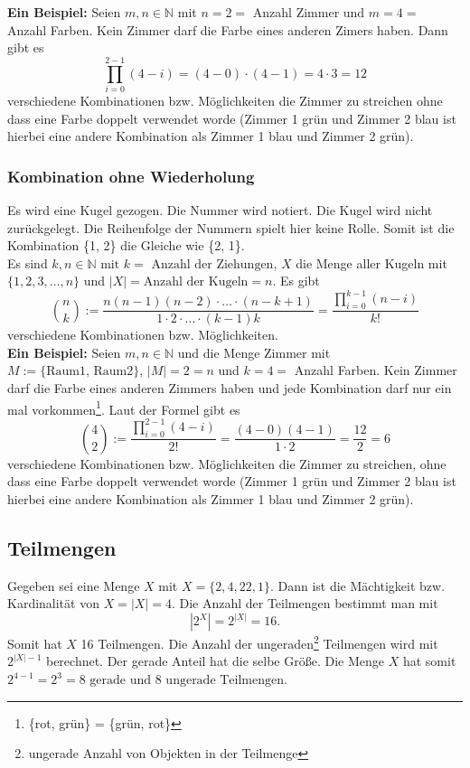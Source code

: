 \documentclass[12pt, twoside]{article}
\newcommand{\N}{\mathbb{N}}
\begin{document}
\textbf{Ein Beispiel:} Seien $m, n \in \N$ mit $n=2=$ Anzahl Zimmer und $m=4=$ Anzahl Farben. Kein Zimmer darf
die Farbe eines anderen Zimers haben. Dann gibt es 
$$
\prod_{i=0}^{2-1}(4-i)=(4-0)\cdot (4-1)=4 \cdot 3 = 12
$$
verschiedene Kombinationen bzw. Möglichkeiten die Zimmer zu streichen ohne dass eine Farbe doppelt verwendet worde (Zimmer 1
grün und Zimmer 2 blau ist hierbei eine andere Kombination als Zimmer 1 blau und Zimmer 2 grün).

\subsubsection{Kombination ohne Wiederholung}
Es wird eine Kugel gezogen. Die Nummer wird notiert. Die Kugel wird nicht zurückgelegt. Die Reihenfolge der Nummern
spielt hier keine Rolle. Somit ist die Kombination \{1, 2\} die Gleiche wie \{2, 1\}. \\

Es sind $k, n \in \N \text{ mit }k= \text{ Anzahl der Ziehungen}$, $X$ die Menge aller Kugeln mit $\{1, 2, 3, \dots, n\}$ und $|X|= \text{Anzahl der Kugeln}=n$. Es gibt 
$$
\binom{n}{k}:= \frac{n(n-1)(n-2) \cdot \ldots \cdot (n-k+1)}{1 \cdot 2 \cdot \ldots \cdot (k-1)k} = \frac { \prod_{i=0}^{k-1}(n-i)}{k!}
$$
verschiedene Kombinationen bzw. Möglichkeiten. \\

\textbf{Ein Beispiel:} Seien $m, n \in \N$ und die Menge Zimmer mit $M:=\{ \text{Raum1, Raum2} \}$, $|M|=2=n$ und $k=4=$ Anzahl Farben. Kein Zimmer darf
die Farbe eines anderen Zimmers haben und jede Kombination darf nur ein mal vorkommen\footnote{ \{rot, grün\} = \{grün, rot\}}. Laut der Formel gibt es
$$
\binom{4}{2}:=\frac { \prod_{i=0}^{2-1}(4-i)}{2!} = \frac{(4-0)(4-1)}{1 \cdot 2}= \frac{12}{2}=6
$$
verschiedene Kombinationen bzw. Möglichkeiten die Zimmer zu streichen, ohne dass eine Farbe doppelt verwendet worde (Zimmer 1
grün und Zimmer 2 blau ist hierbei eine andere Kombination als Zimmer 1 blau und Zimmer 2 grün).






\subsection{Teilmengen}
Gegeben sei eine Menge $X$ mit $X=\{2, 4,22 ,1\}$. Dann ist die Mächtigkeit bzw. Kardinalität von $X=|X|=4$. Die Anzahl der Teilmengen bestimmt
man mit
$$
|2^X|=2^{|X|}=16.
$$
Somit hat $X$ 16 Teilmengen. Die Anzahl der ungeraden\footnote{ungerade Anzahl von Objekten in der Teilmenge} Teilmengen wird mit $2^{|X|-1}$ berechnet. Der gerade Anteil hat die selbe Größe. Die Menge $X$
hat somit $2^{4-1}=2^3=8 \text{ gerade und } 8 \text{ ungerade Teilmengen}$.
\end{document}
